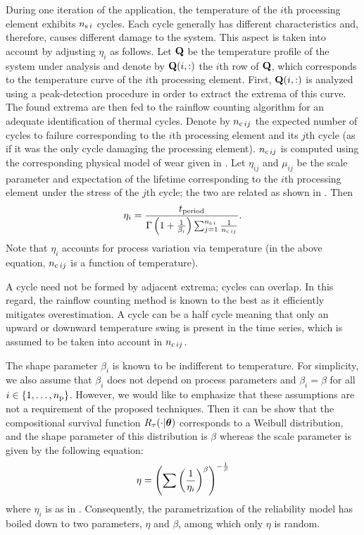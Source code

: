 During one iteration of the application, the temperature of the $i$th processing element exhibits $\nsegments[i]$ cycles.
Each cycle generally has different characteristics and, therefore, causes different damage to the system.
This aspect is taken into account by adjusting $\eta_i$ as follows.
Let $\mQ$ be the temperature profile of the system under analysis and denote by $\mQ(i, :)$ the $i$th row of $\mQ$, which corresponds to the temperature curve of the $i$th processing element.
First, $\mQ(i, :)$ is analyzed using a peak-detection procedure in order to extract the extrema of this curve.
The found extrema are then fed to the rainflow counting algorithm \cite{xiang2010} for an adequate identification of thermal cycles.
Denote by $\ncycles[ij]$ the expected number of cycles to failure corresponding to the $i$th processing element and its $j$th cycle (as if it was the only cycle damaging the processing element).
$\ncycles[ij]$ is computed using the corresponding physical model of wear given in \cite{jedec, xiang2010}.
Let $\eta_{ij}$ and $\mu_{ij}$ be the scale parameter and expectation of the lifetime corresponding to the $i$th processing element under the stress of the $j$th cycle; the two are related as shown in .
Then \cite{ukhov2012, xiang2010}
\begin{equation} \elab{weibull-eta}
  \eta_i = \frac{\period}{\Gamma\left(1 + \frac{1}{\beta_i}\right) \sum_{j = 1}^{\nsegments[i]} \frac{1}{\ncycles[ij]}}.
\end{equation}
Note that $\eta_i$ accounts for process variation via temperature (in the above equation, $\ncycles[ij]$ is a function of temperature).

\begin{remark} 
A cycle need not be formed by adjacent extrema; cycles can overlap.
In this regard, the rainflow counting method is known to the best as it efficiently mitigates overestimation.
A cycle can be a half cycle meaning that only an upward or downward temperature swing is present in the time series, which is assumed to be taken into account in $\ncycles[ij]$.
\end{remark}

The shape parameter $\beta_i$ is known to be indifferent to temperature.
For simplicity, we also assume that $\beta_i$ does not depend on process parameters and $\beta_i = \beta$ for all $i \in \{ 1, \dotsc, \nprocs \}$.
However, we would like to emphasize that these assumptions are not a requirement of the proposed techniques.
Then it can be show that the compositional survival function $\survival_\T(\cdot | \pvw)$ corresponds to a Weibull distribution, and the shape parameter of this distribution is $\beta$ whereas the scale parameter is given by the following equation:
\begin{equation} \elab{compound-weibull-eta}
  \eta = \left(\sum \left( \frac{1}{\eta_i} \right)^\beta \right)^{-\frac{1}{\beta}}
\end{equation}
where $\eta_i$ is as in .
Consequently, the parametrization of the reliability model has boiled down to two parameters, $\eta$ and $\beta$, among which only $\eta$ is random.

